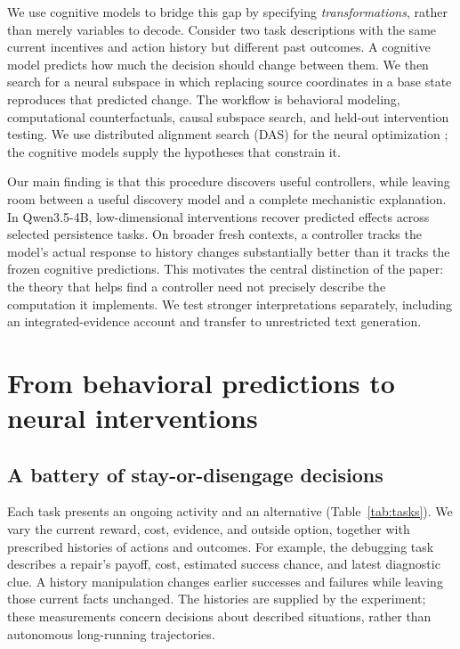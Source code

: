 \documentclass{article}
\begin{document}
We use cognitive models to bridge this gap by specifying \emph{transformations}, rather than merely variables to decode. Consider two task descriptions with the same current incentives and action history but different past outcomes. A cognitive model predicts how much the decision should change between them. We then search for a neural subspace in which replacing source coordinates in a base state reproduces that predicted change. The workflow is behavioral modeling, computational counterfactuals, causal subspace search, and held-out intervention testing. We use distributed alignment search (DAS) for the neural optimization \citep{geiger2024alignments,wu2023scale}; the cognitive models supply the hypotheses that constrain it.

Our main finding is that this procedure discovers useful controllers, while leaving room between a useful discovery model and a complete mechanistic explanation. In Qwen3.5-4B, low-dimensional interventions recover predicted effects across selected persistence tasks. On broader fresh contexts, a controller tracks the model's actual response to history changes substantially better than it tracks the frozen cognitive predictions. This motivates the central distinction of the paper: the theory that helps find a controller need not precisely describe the computation it implements. We test stronger interpretations separately, including an integrated-evidence account and transfer to unrestricted text generation.

\section{From behavioral predictions to neural interventions}\label{sec:framework}
\subsection{A battery of stay-or-disengage decisions}\label{sec:behavior}
Each task presents an ongoing activity and an alternative (Table~\ref{tab:tasks}). We vary the current reward, cost, evidence, and outside option, together with prescribed histories of actions and outcomes. For example, the debugging task describes a repair's payoff, cost, estimated success chance, and latest diagnostic clue. A history manipulation changes earlier successes and failures while leaving those current facts unchanged. The histories are supplied by the experiment; these measurements concern decisions about described situations, rather than autonomous long-running trajectories.
\end{document}
